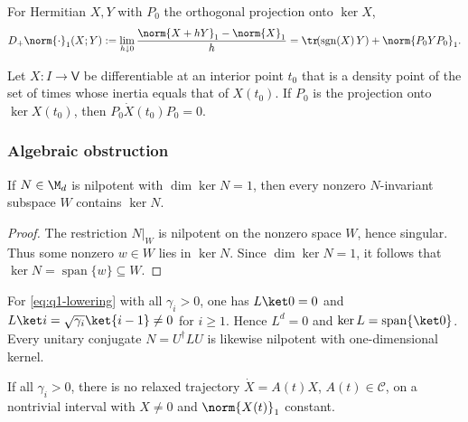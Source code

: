\documentclass[class=article,11pt,a4paper,crop=false]{standalone}
\begin{document}
\begin{lemma}
	\label{lem:q1-trace-directional}
	For Hermitian $X,Y$ with $P_0$ the orthogonal projection onto $\ker X$,
	\begin{equation}
		D_+\norm{\cdot}_1(X;Y)
		:=\lim_{h\downarrow0}\frac{\norm{X+hY}_1-\norm{X}_1}{h}
		=\tr\!(\operatorname{sgn}(X)\,Y)+\norm{P_0YP_0}_1.
		\label{eq:q1-trace-directional}
	\end{equation}
\end{lemma}

\begin{lemma}
	\label{lem:q1-fixed-inertia}
	Let $X:I\to\mathsf V$ be differentiable at an interior point $t_0$ that is a
	density point of the set of times whose inertia equals that of $X(t_0)$. If
	$P_0$ is the projection onto $\ker X(t_0)$, then
	$P_0\dot X(t_0)P_0=0$.
\end{lemma}

\subsubsection*{Algebraic obstruction}

\begin{lemma}
	\label{lem:q1-nilpotent}
	If $N\in\M_d$ is nilpotent with $\dim\ker N=1$, then every nonzero
	$N$-invariant subspace $W$ contains $\ker N$.
\end{lemma}

\begin{proof}
	The restriction $N|_W$ is nilpotent on the nonzero space $W$, hence
	singular. Thus some nonzero $w\in W$ lies in $\ker N$. Since
	$\dim\ker N=1$, it follows that
	$\ker N=\operatorname{span}\{w\}\subseteq W$.
\end{proof}

For \eqref{eq:q1-lowering} with all $\gamma_i>0$, one has
$L\ket0=0$ and
$L\ket i=\sqrt{\gamma_i}\ket{i-1}\ne0$ for $i\ge1$. Hence $L^d=0$ and
$\ker L=\operatorname{span}\{\ket0\}$. Every unitary conjugate
$N=U^\dagger LU$ is likewise nilpotent with one-dimensional kernel.

\begin{lemma}
	\label{lem:q1-no-constant}
	If all $\gamma_i>0$, there is no relaxed trajectory $\dot X=A(t)X$,
	$A(t)\in\mathcal C$, on a nontrivial interval with $X\ne0$ and
	$\norm{X(t)}_1$ constant.
\end{lemma}
\end{document}
